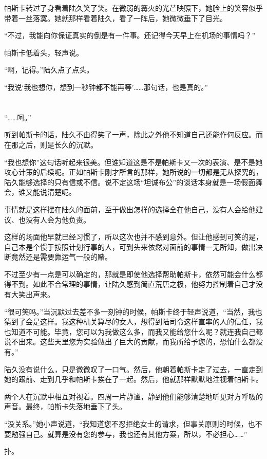 帕斯卡转过了身看着陆久笑了笑。在微弱的篝火的光芒映照下，她脸上的笑容似乎带着一丝落寞。她就那样看着陆久，看了一阵后，她微微垂下了目光。

“不过，我能向你保证真实的倒是有一件事。还记得今天早上在机场的事情吗？”

帕斯卡低着头，轻声说。

“啊，记得。”陆久点了点头。

“我说‘我也想你，想到一秒钟都不能再等’……那句话，也是真的。”\section*{}

“……呵。”

听到帕斯卡的话，陆久不由得笑了一声，除此之外他不知道自己还能作何反应。而在那之后，则是长久的沉默。

“我也想你”这句话听起来很美。但谁知道这是不是帕斯卡又一次的表演、是不是她攻心计策的后续呢。正如帕斯卡刚才所言的那样，她所说的一切都是无从探究的，陆久能够选择的只有信或不信。说不定这场“坦诚布公”的谈话本身就是一场假面舞会，谁又能说清楚呢。

事情就是这样摆在陆久的面前，至于做出怎样的选择全在他自己，没有人会给他建议、也没有人会为他负责。

这样的场面他早就已经习惯了，所以这次也并不感到意外。但让他感到可笑的是，自己本是个惯于按照计划行事的人，可到头来依然对面前的事情一无所知，做出决断竟然还是需要靠运气一般的赌。

不过至少有一点是可以确定的，那就是即使他选择帮助帕斯卡，依然可能会什么都得不到。如此不合常理的事情，让陆久感到简直荒唐之极，他努力控制着自己才没有大笑出声来。

“很可笑吗。”当沉默过去差不多一刻钟的时候，帕斯卡终于轻声说道，“当然，我也猜到了会是这样。我这种机关算尽的女人，想得到陆司令这样直率的人的信任，我也知道不可能。毕竟，您可以为我做这么多，而我又能给您什么呢？就连我自己都说不出来。这些天里您为实验做出了巨大的贡献，而我所给予您的，恐怕什么都没有。”

陆久没有说什么，只是微微叹了一口气。然后，他朝着帕斯卡走了过去，一直走到她的跟前、走到几乎和帕斯卡挨在了一起。然后，他就那样默默地注视着帕斯卡。

两个人在沉默中相互对视着。四周一片静谧，静到他们能够清楚地听见对方呼吸的声音。最终，帕斯卡失落地垂下了头。

“没关系。”她小声说道，“我知道您不忍拒绝女士的请求，但事关原则的时候，也不要勉强自己。就算是没有您的参与，我也还有其他方案，所以，不必担心……”

扑。

